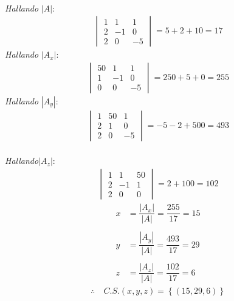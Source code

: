 \documentclass[11pt, a4paper]{article}
\begin{document}
\begin{multicols}{2}
  \\
  \textit{Hallando} $|A|$:
  \begin{align*}
    \begin{vmatrix}
      1 & 1 & 1\\
      2 & -1 & 0\\
      2 & 0 & -5
    \end{vmatrix} = 5+2+10 = 17
  \end{align*}
  \textit{Hallando} $|A_x|$:
  \begin{align*}
    \begin{vmatrix}
      50 & 1 & 1\\
      1 & -1 & 0\\
      0 & 0 & -5
    \end{vmatrix} = 250+5+0 = 255
  \end{align*}
  \textit{Hallando} $|A_y|$:
  \begin{align*}
    \begin{vmatrix}
      1 & 50 & 1\\
      2 & 1 & 0\\
      2 & 0 & -5
    \end{vmatrix} = -5-2+500 = 493
  \end{align*}
  \columnbreak\\
  \columnseprule=1pt
  \textit{Hallando}$|A_z|$:
  \begin{align*}
    \begin{vmatrix}
      1 & 1 & 50\\
      2 & -1 & 1\\
      2 & 0 & 0
    \end{vmatrix} = 2+100 = 102
  \end{align*}
  \begin{align*}
    x &= \dfrac{|A_x|}{|A|} = \dfrac{255}{17} = 15\\\\
    y &= \dfrac{|A_y|}{|A|} = \dfrac{493}{17} = 29\\\\
    z &= \dfrac{|A_z|}{|A|} = \dfrac{102}{17} = 6
  \end{align*}
  \begin{align*}
    \therefore \ &C.S. \left(x,y,z\right) = \left\{\left(15,29,6\right)\right\}
  \end{align*}
\end{multicols}
\newpage
\end{document}
